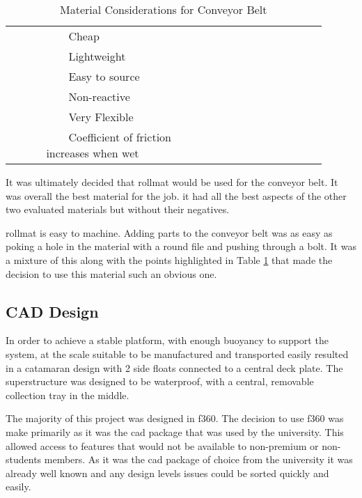\documentclass [11pt]{article}
\newcommand{\tabitem}{~~\llap{\textbullet}~~}
\begin{document}
\begin{table}[H]
\begin{tabular}{|p{0.1\linewidth}|p{0.4\linewidth}|p{0.4\linewidth}|}
\cellcolor{gray!20}  & \cellcolor{gray!20} \tabitem Cheap & \cellcolor{gray!20} \\
\cellcolor{gray!20}  & \cellcolor{gray!20} \tabitem Lightweight & \cellcolor{gray!20} \\
\cellcolor{gray!20}  & \cellcolor{gray!20} \tabitem Easy to source & \cellcolor{gray!20} \\
\cellcolor{gray!20}  & \cellcolor{gray!20} \tabitem Non-reactive & \cellcolor{gray!20} \\
\cellcolor{gray!20}  & \cellcolor{gray!20} \tabitem Very Flexible & \cellcolor{gray!20} \\
\cellcolor{gray!20}  & \cellcolor{gray!20} \tabitem Coefficient of friction increases when wet & \cellcolor{gray!20} \\
\hline
\end{tabular}
\caption{Material Considerations for Conveyor Belt}
\label{table:conveyor_materials}
\end{table} 

It was ultimately decided that \gls{rollmat} \cite{Plastazote} would be used for the conveyor belt. It was overall the best material for the job. it had all the best aspects of the other two evaluated materials but without their negatives. 

\Gls{rollmat} is easy to machine. Adding parts to the conveyor belt was as easy as poking a hole in the material with a round file and pushing through a bolt. It was a mixture of this along with the points highlighted in Table \ref{table:conveyor_materials} that made the decision to use this material such an obvious one. 


\subsection{CAD Design}

In order to achieve a stable platform, with enough buoyancy to support the system, at the scale suitable to be manufactured and transported easily resulted in a catamaran design with 2 side floats connected to a central deck plate.
The superstructure was designed to be waterproof, with a central, removable collection tray in the middle.

The majority of this project was designed in \gls{f360}. The decision to use \gls{f360} was  make primarily as it was the \gls{cad} package that was used by the university. This allowed access to features that would not be available to non-premium or non-students members. As it was the \gls{cad} package of choice from the university it was already well known and any design levels issues could be sorted quickly and easily. 
\end{document}

